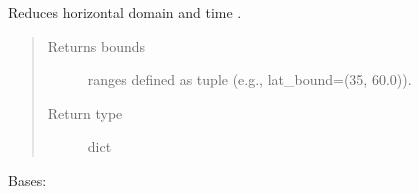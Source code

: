 \documentclass[a4paper,11pt,english]{sphinxmanual}
\begin{document}
\begin{fulllineitems}
\begin{fulllineitems}
\label{\detokenize{envlib:envlib.weather_store.WeatherStore.reduce_domain}}
\sphinxAtStartPar
Reduces horizontal domain and time .
\begin{quote}\begin{description}
\item[{Returns bounds}] \leavevmode
\sphinxAtStartPar
ranges defined as tuple (e.g., lat\_bound=(35, 60.0)).

\item[{Return type}] \leavevmode
\sphinxAtStartPar
dict

\end{description}\end{quote}

\end{fulllineitems}


\end{fulllineitems}


\begin{fulllineitems}
\label{\detokenize{envlib:envlib.weather_store.WeatherStore_}}
\sphinxAtStartPar
Bases: {\hyperref[\detokenize{envlib:envlib.weather_store.GeoArrayHandler}]{}}

\begin{fulllineitems}
\label{\detokenize{envlib:envlib.weather_store.WeatherStore_.axes}}
\end{fulllineitems}


\end{fulllineitems}

\end{document}
